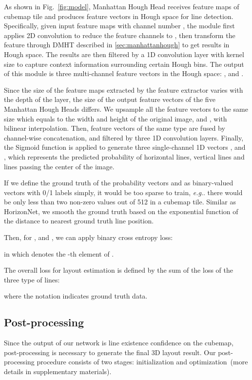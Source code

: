 \documentclass[runningheads]{llncs}
\makeatletter
\DeclareRobustCommand\onedot{\futurelet\@let@token\@onedot}
\def\@onedot{\ifx\@let@token.\else.\null\fi\xspace}
\def\eg{\emph{e.g}\onedot} \def\Eg{\emph{E.g}\onedot}
\makeatother
\begin{document}
As shown in Fig.~\ref{fig:model}, Manhattan Hough Head receives feature maps of cubemap tile and produces feature vectors in Hough space for line detection. Specifically, given input feature maps with channel number , the module first applies 2D convolution to reduce the feature channels to , then transform the feature through DMHT described in \ref{sec:manhattanhough} to get results in Hough space. The results are then filtered by a 1D convolution layer with kernel size  to capture context information surrounding certain Hough bins. The output of this module is three multi-channel feature vectors in the Hough space: ,  and . 

Since the size of the feature maps extracted by the feature extractor varies with the depth of the layer, the size of the output feature vectors of the five Manhattan Hough Heads differs. We upsample all the feature vectors to the same size which equals to the width and height of the original image,  and , with bilinear interpolation. Then, feature vectors of the same type are fused by channel-wise concatenation, and filtered by three 1D convolution layers.
Finally, the Sigmoid function is applied to generate three single-channel 1D vectors ,  and , which represents the predicted probability of horizontal lines, vertical lines and lines passing the center of the image. 

If we define the ground truth of the probability vectors  and  as binary-valued vectors with 0/1 labels simply, it would be too sparse to train, \eg there would be only less than two non-zero values out of 512 in a cubemap tile.
Similar as HorizonNet\cite{sun2019horizonnet}, we smooth the ground truth based on the exponential function of the distance to nearest ground truth line position. 


Then, for ,  and , we can apply binary cross entropy loss:

in which  denotes the -th element of .

The overall loss for layout estimation is defined by the sum of the loss of the three type of lines:

where the notation  indicates ground truth data.

\subsection{Post-processing}\label{sec:post}
Since the output of our network is line existence confidence on the cubemap, post-processing is necessary to generate the final 3D layout result. Our post-processing procedure consists of two stages: initialization and optimization~(more details in supplementary materials).
\end{document}
